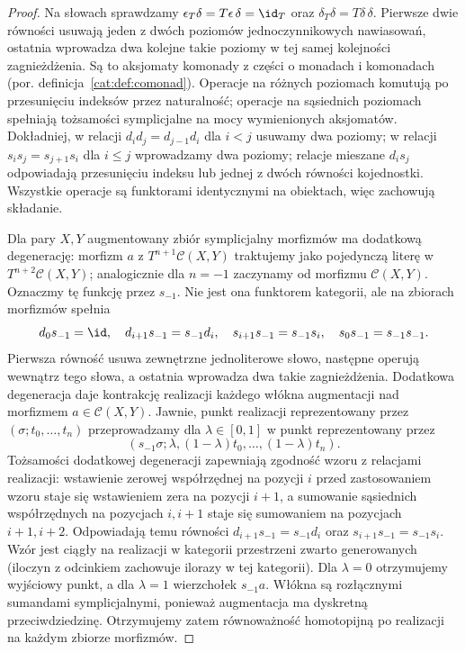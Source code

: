 \begin{proof}
Na słowach sprawdzamy $\epsilon_T\delta=T\epsilon\,\delta=\id_T$ oraz $\delta_T\delta=T\delta\,\delta$. Pierwsze dwie równości usuwają jeden z dwóch poziomów jednoczynnikowych nawiasowań, ostatnia wprowadza dwa kolejne takie poziomy w tej samej kolejności zagnieżdżenia. Są to aksjomaty komonady z części o monadach i komonadach (por. definicja~\ref{cat:def:comonad}). Operacje na różnych poziomach komutują po przesunięciu indeksów przez naturalność; operacje na sąsiednich poziomach spełniają tożsamości symplicjalne na mocy wymienionych aksjomatów. Dokładniej, w relacji $d_id_j=d_{j-1}d_i$ dla $i<j$ usuwamy dwa poziomy; w relacji $s_is_j=s_{j+1}s_i$ dla $i\leq j$ wprowadzamy dwa poziomy; relacje mieszane $d_is_j$ odpowiadają przesunięciu indeksu lub jednej z dwóch równości kojednostki. Wszystkie operacje są funktorami identycznymi na obiektach, więc zachowują składanie.

Dla pary $X,Y$ augmentowany zbiór symplicjalny morfizmów ma dodatkową degenerację: morfizm $a$ z $T^{n+1}\mathcal C(X,Y)$ traktujemy jako pojedynczą literę w $T^{n+2}\mathcal C(X,Y)$; analogicznie dla $n=-1$ zaczynamy od morfizmu $\mathcal C(X,Y)$. Oznaczmy tę funkcję przez $s_{-1}$. Nie jest ona funktorem kategorii, ale na zbiorach morfizmów spełnia
\[
 d_0s_{-1}=\id,\quad
 d_{i+1}s_{-1}=s_{-1}d_i,\quad
 s_{i+1}s_{-1}=s_{-1}s_i,\quad
 s_0s_{-1}=s_{-1}s_{-1}.
\]
Pierwsza równość usuwa zewnętrzne jednoliterowe słowo, następne operują wewnątrz tego słowa, a ostatnia wprowadza dwa takie zagnieżdżenia. Dodatkowa degeneracja daje kontrakcję realizacji każdego włókna augmentacji nad morfizmem $a\in\mathcal C(X,Y)$. Jawnie, punkt realizacji reprezentowany przez $(\sigma;t_0,\ldots,t_n)$ przeprowadzamy dla $\lambda\in[0,1]$ w punkt reprezentowany przez
\[
 (s_{-1}\sigma;\lambda,(1-\lambda)t_0,\ldots,(1-\lambda)t_n).
\]
Tożsamości dodatkowej degeneracji zapewniają zgodność wzoru z relacjami realizacji: wstawienie zerowej współrzędnej na pozycji $i$ przed zastosowaniem wzoru staje się wstawieniem zera na pozycji $i+1$, a sumowanie sąsiednich współrzędnych na pozycjach $i,i+1$ staje się sumowaniem na pozycjach $i+1,i+2$. Odpowiadają temu równości $d_{i+1}s_{-1}=s_{-1}d_i$ oraz $s_{i+1}s_{-1}=s_{-1}s_i$. Wzór jest ciągły na realizacji w kategorii przestrzeni zwarto generowanych (iloczyn z odcinkiem zachowuje ilorazy w tej kategorii). Dla $\lambda=0$ otrzymujemy wyjściowy punkt, a dla $\lambda=1$ wierzchołek $s_{-1}a$. Włókna są rozłącznymi sumandami symplicjalnymi, ponieważ augmentacja ma dyskretną przeciwdziedzinę. Otrzymujemy zatem równoważność homotopijną po realizacji na każdym zbiorze morfizmów.
\end{proof}

